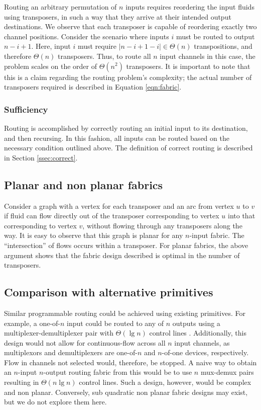 Routing an arbitrary permutation of $n$ inputs requires reordering the input fluids using transposers, in such a way that they arrive at their intended output destinations. We observe that each transposer is capable of reordering exactly two channel positions. Consider the scenario where inputs $i$ must be routed to output $n-i+1$. Here, input $i$ must require $|n-i+1-i| \in \Theta(n)$ transpositions, and therefore $\Theta(n)$ transposers. Thus, to route all $n$ input channels in this case, the problem scales on the order of $\Theta(n^2)$ transposers. It is important to note that this is a claim regarding the routing problem's complexity; the actual number of transposers required is described in Equation \ref{eqn:fabric}.

\subsubsection{Sufficiency}

Routing is accomplished by correctly routing an initial input to its destination, and then recursing. In this fashion, all inputs can be routed based on the necessary condition outlined above. The definition of correct routing is described in Section \ref{ssec:correct}.

\subsection{Planar and non planar fabrics}
Consider a graph with a vertex for each transposer and an arc from vertex $u$ to $v$ if fluid can flow directly out of the transposer corresponding to vertex $u$ into that corresponding to vertex $v$, without flowing through any  transposers along the way. It is easy to observe that this graph is planar for any $n$-input fabric. The ``intersection'' of flows occurs within a transposer. For planar fabrics, the above argument shows that the fabric design described is optimal in the number of transposers. 

\subsection{Comparison with alternative primitives}
\label{ssec:alts}
Similar programmable routing could be achieved using existing primitives. For example, a one-of-$n$ input could be routed to any of $n$ outputs using a multiplexer-demultiplexer pair with $\Theta(\lg n)$ control lines \cite{thorsen2002}. Additionally, this design would not allow for continuous-flow across all $n$ input channels, as multiplexors and demultiplexers are one-of-$n$ and $n$-of-one devices, respectively. Flow in channels not selected would, therefore, be stopped. A naive way to obtain an $n$-input $n$-output routing fabric from this would be to use $n$ mux-demux pairs resulting in $\Theta(n \lg n)$ control lines. Such a design, however, would be complex and non planar. Conversely, sub quadratic non planar fabric designs may exist, but we do not explore them here.

